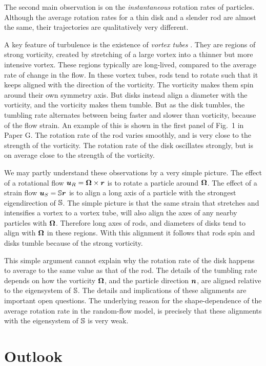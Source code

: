 \documentclass[thesis.tex]{subfiles}
\begin{document}
The second main observation is on the \emph{instantaneous} rotation rates of particles. Although the average rotation rates for a thin disk and a slender rod are almost the same, their trajectories are qualitatively very different.

A key feature of turbulence is the existence of \emph{vortex tubes} \cite{she1990}. They are regions of strong vorticity, created by stretching of a large vortex into a thinner but more intensive vortex. These regions typically are long-lived, compared to the average rate of change in the flow. In these vortex tubes, rods tend to rotate such that it keeps aligned with the direction of the vorticity. The vorticity makes them spin around their own symmetry axis. But disks instead align a diameter with the vorticity, and the vorticity makes them tumble. But as the disk tumbles, the tumbling rate alternates between being faster and slower than vorticity, because of the flow strain. An example of this is shown in the first panel of Fig.~1 in Paper G. The rotation rate of the rod varies smoothly, and is very close to the strength of the vorticity. The rotation rate of the disk oscillates strongly, but is on average close to the strength of the vorticity.

We may partly understand these observations by a very simple picture. The effect of a rotational flow $\mbox{\boldmath$u$}_R= \mbox{\boldmath$\Omega$} \times \mbox{\boldmath$r$}$ is to rotate a particle around $\mbox{\boldmath$\Omega$}$. The effect of a strain flow $\mbox{\boldmath$u$}_S=\mathbb{S} \mbox{\boldmath$r$}$ is to align a long axis of a particle with the strongest eigendirection of $\mathbb{S}$. The simple picture is that the same strain that stretches and intensifies a vortex to a vortex tube, will also align the axes of any nearby particles with $\mbox{\boldmath$\Omega$}$. Therefore long axes of rods, and diameters of disks tend to align with $\mbox{\boldmath$\Omega$}$ in these regions. With this alignment it follows that rods spin and disks tumble because of the strong vorticity.

This simple argument cannot explain why the rotation rate of the disk happens to average to the same value as that of the rod. The details of the tumbling rate depends on how the vorticity $\mbox{\boldmath$\Omega$}$, and the particle direction $\mbox{\boldmath$n$}$, are aligned relative to the eigensystem of $\mathbb{S}$. The details and implications of these alignments are important open questions. The underlying reason for the shape-dependence of the average rotation rate in the random-flow model, is precisely that these alignments with the eigensystem of $\mathbb{S}$ is very weak.

\chapter{Outlook}
\end{document}
